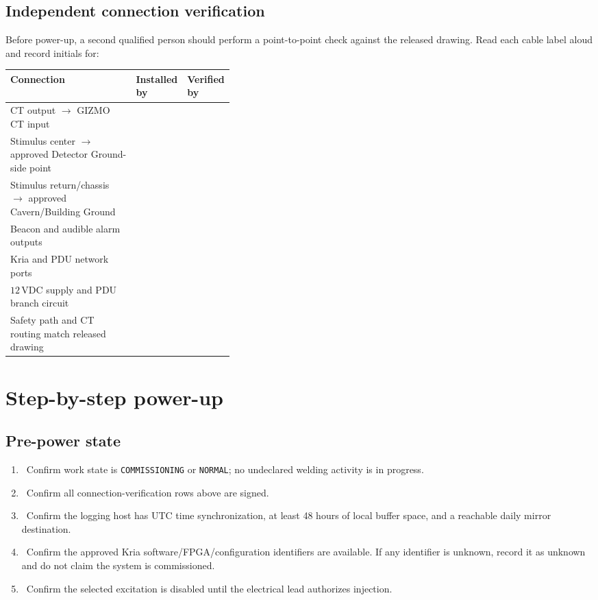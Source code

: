 \documentclass[11pt]{article}
\newcommand{\GIZMO}{\textsc{GIZMO}}
\newcommand{\checkbox}{\raisebox{0.15ex}{\fbox{\rule{0pt}{1.15ex}\rule{1.15ex}{0pt}}}}
\begin{document}
\subsection{Independent connection verification}

Before power-up, a second qualified person should perform a point-to-point check against the released drawing. Read each cable label aloud and record initials for:

\begin{center}
\begin{tabularx}{0.94\linewidth}{@{}Y L{0.19\linewidth} L{0.19\linewidth}@{}}
\toprule
Connection & Installed by & Verified by \\
\midrule
CT output $\rightarrow$ \GIZMO{} CT input & & \\
Stimulus center $\rightarrow$ approved Detector Ground-side point & & \\
Stimulus return/chassis $\rightarrow$ approved Cavern/Building Ground & & \\
Beacon and audible alarm outputs & & \\
Kria and PDU network ports & & \\
$12\,\mathrm{VDC}$ supply and PDU branch circuit & & \\
Safety path and CT routing match released drawing & & \\
\bottomrule
\end{tabularx}
\end{center}

\section{Step-by-step power-up}

\subsection{Pre-power state}

\begin{enumerate}
  \item \checkbox\ Confirm work state is \texttt{COMMISSIONING} or \texttt{NORMAL}; no undeclared welding activity is in progress.
  \item \checkbox\ Confirm all connection-verification rows above are signed.
  \item \checkbox\ Confirm the logging host has UTC time synchronization, at least 48 hours of local buffer space, and a reachable daily mirror destination.
  \item \checkbox\ Confirm the approved Kria software/FPGA/configuration identifiers are available. If any identifier is unknown, record it as unknown and do not claim the system is commissioned.
  \item \checkbox\ Confirm the selected excitation is disabled until the electrical lead authorizes injection.
\end{enumerate}
\end{document}
